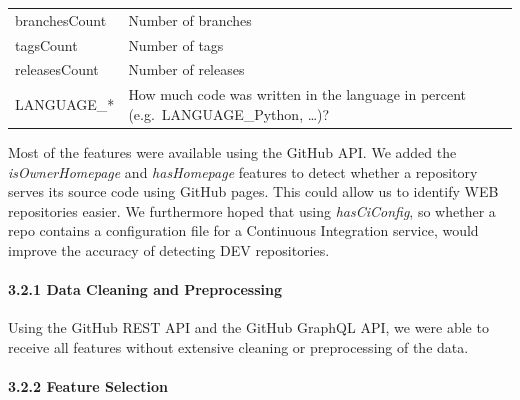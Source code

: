 \documentclass{article}
\begin{document}
\begin{longtable}[]{@{}ll@{}}
\begin{minipage}[t]{0.17\columnwidth}\raggedright\strut
branchesCount\strut
\end{minipage} & \begin{minipage}[t]{0.16\columnwidth}\raggedright\strut
Number of branches\strut
\end{minipage}\tabularnewline
\begin{minipage}[t]{0.17\columnwidth}\raggedright\strut
tagsCount\strut
\end{minipage} & \begin{minipage}[t]{0.16\columnwidth}\raggedright\strut
Number of tags\strut
\end{minipage}\tabularnewline
\begin{minipage}[t]{0.17\columnwidth}\raggedright\strut
releasesCount\strut
\end{minipage} & \begin{minipage}[t]{0.16\columnwidth}\raggedright\strut
Number of releases\strut
\end{minipage}\tabularnewline
\begin{minipage}[t]{0.17\columnwidth}\raggedright\strut
LANGUAGE\_*\strut
\end{minipage} & \begin{minipage}[t]{0.16\columnwidth}\raggedright\strut
How much code was written in the language in percent
(e.g.~LANGUAGE\_Python, \ldots{})?\strut
\end{minipage}\tabularnewline
\bottomrule
\end{longtable}

Most of the features were available using the GitHub API. We added the
\emph{isOwnerHomepage} and \emph{hasHomepage} features to detect whether
a repository serves its source code using GitHub pages. This could allow
us to identify WEB repositories easier. We furthermore hoped that using
\emph{hasCiConfig}, so whether a repo contains a configuration file for
a Continuous Integration service, would improve the accuracy of
detecting DEV repositories.

\paragraph{3.2.1 Data Cleaning and
Preprocessing}\label{data-cleaning-and-preprocessing}

Using the GitHub REST API and the GitHub GraphQL API, we were able to
receive all features without extensive cleaning or preprocessing of the
data.

\paragraph{3.2.2 Feature Selection}\label{feature-selection}
\end{document}
